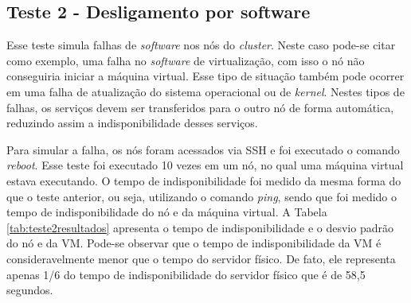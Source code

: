 % 


\subsection{Teste 2 - Desligamento por software}

Esse teste simula falhas de \textit{software} nos nós do \textit{cluster}. Neste caso pode-se citar como exemplo, uma falha no \textit{software} 
de virtualização, com isso o nó não conseguiria iniciar a máquina virtual. Esse tipo de situação também pode ocorrer em uma falha de atualização 
do sistema operacional ou de \textit{kernel}.
Nestes tipos de falhas, os serviços devem ser transferidos para o outro nó de forma automática, reduzindo assim a indisponibilidade desses serviços. 

Para simular a falha, os nós foram acessados via \ac{SSH} e foi executado o comando \textit{reboot}. Esse teste foi executado 10 vezes em um nó, 
no qual uma máquina virtual estava executando. O tempo de indisponibilidade foi medido da mesma forma do que o teste anterior, ou seja, utilizando 
o comando \textit{ping}, sendo que foi medido o tempo de indisponibilidade do nó e da máquina virtual. A Tabela \ref{tab:teste2resultados} 
apresenta o tempo de indisponibilidade e o desvio padrão do nó e da \ac{VM}. Pode-se observar que o tempo de indisponibilidade da \ac{VM} é 
consideravelmente menor que o tempo do servidor físico. 
De fato, ele representa apenas 1/6 do tempo de indisponibilidade do servidor físico que é de 58,5 segundos. 



